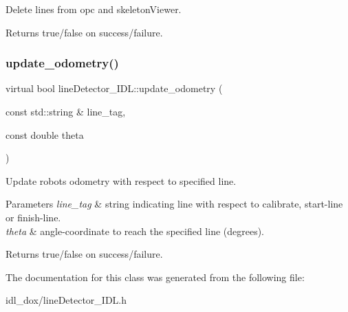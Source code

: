 Delete lines from opc and skeleton\+Viewer. 

\begin{DoxyReturn}{Returns}
true/false on success/failure. 
\end{DoxyReturn}
\mbox{\label{classlineDetector__IDL_ad4a235bdfaed101e3dd2435902347df3}} 
\subsubsection{\texorpdfstring{update\_odometry()}{update\_odometry()}}
{\footnotesize\ttfamily virtual bool line\+Detector\+\_\+\+I\+D\+L\+::update\+\_\+odometry (\begin{DoxyParamCaption}\item[{const std\+::string \&}]{line\+\_\+tag,  }\item[{const double}]{theta }\end{DoxyParamCaption})\hspace{0.3cm}{\ttfamily [virtual]}}



Update robot\textquotesingle{}s odometry with respect to specified line. 


\begin{DoxyParams}{Parameters}
{\em line\+\_\+tag} & string indicating line with respect to calibrate, start-\/line or finish-\/line. \\
\hline
{\em theta} & angle-\/coordinate to reach the specified line (degrees). \\
\hline
\end{DoxyParams}
\begin{DoxyReturn}{Returns}
true/false on success/failure. 
\end{DoxyReturn}


The documentation for this class was generated from the following file\+:\begin{DoxyCompactItemize}
\item 
idl\+\_\+dox/line\+Detector\+\_\+\+I\+D\+L.\+h\end{DoxyCompactItemize}

